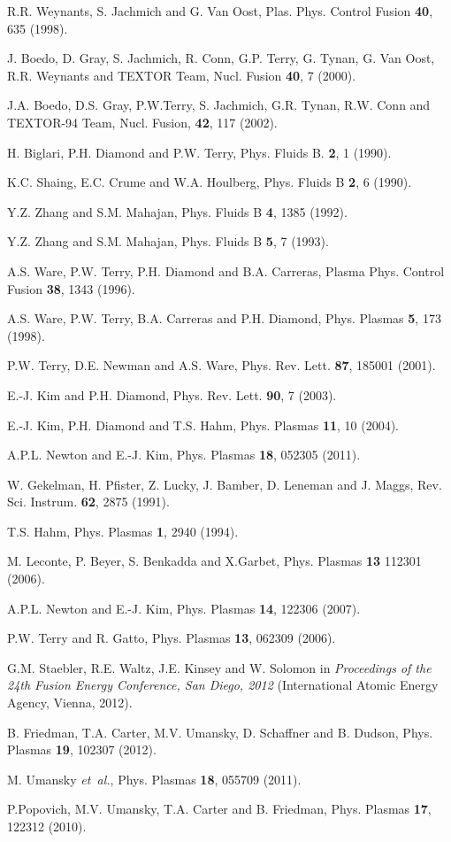\documentclass[aip,pop,amsmath,amssymb,preprint,superscriptaddress]{revtex4-1} %
\begin{document}
\begin{thebibliography}{10}
R.R. Weynants, S. Jachmich and G. Van Oost, Plas. Phys. Control Fusion {\bf 40}, 635 (1998).

J. Boedo, D. Gray, S. Jachmich, R. Conn, G.P. Terry, G. Tynan, G. Van Oost, R.R. Weynants and TEXTOR Team, Nucl. Fusion {\bf 40},  7  (2000).

J.A. Boedo, D.S. Gray, P.W.Terry, S. Jachmich, G.R. Tynan, R.W. Conn and TEXTOR-94 Team, Nucl. Fusion, {\bf 42}, 117 (2002).

H. Biglari, P.H. Diamond and P.W. Terry, Phys. Fluids B. {\bf 2},  1  (1990).

K.C. Shaing, E.C. Crume and W.A. Houlberg, Phys. Fluids B {\bf 2}, 6 (1990).

Y.Z. Zhang and S.M. Mahajan, Phys. Fluids B {\bf 4}, 1385 (1992).

Y.Z. Zhang and S.M. Mahajan, Phys. Fluids B {\bf 5}, 7 (1993).

A.S. Ware, P.W. Terry, P.H. Diamond and B.A. Carreras, Plasma Phys. Control Fusion {\bf 38},  1343  (1996).

A.S. Ware, P.W. Terry, B.A. Carreras and P.H. Diamond, Phys. Plasmas {\bf 5}, 173 (1998).

P.W. Terry, D.E. Newman and A.S. Ware, Phys. Rev. Lett. {\bf 87}, 185001  (2001).

E.-J. Kim and P.H. Diamond, Phys. Rev. Lett. {\bf 90}, 7 (2003).

E.-J. Kim, P.H. Diamond and T.S. Hahm, Phys. Plasmas {\bf 11},  10  (2004).

A.P.L. Newton and E.-J. Kim, Phys. Plasmas {\bf 18}, 052305 (2011).

W. Gekelman, H. Pfister, Z. Lucky, J. Bamber, D. Leneman and J. Maggs, Rev. Sci. Instrum. {\bf 62},  2875  (1991).

T.S. Hahm, Phys. Plasmas {\bf 1}, 2940 (1994).

M. Leconte, P. Beyer, S. Benkadda and X.Garbet, Phys. Plasmas {\bf 13} 112301 (2006).

A.P.L. Newton and E.-J. Kim, Phys. Plasmas {\bf 14}, 122306 (2007).

P.W. Terry and R. Gatto, Phys. Plasmas {\bf 13}, 062309 (2006).

G.M. Staebler, R.E. Waltz, J.E. Kinsey and W. Solomon in \textit{Proceedings of the 24th Fusion Energy Conference, San Diego, 2012} (International Atomic Energy Agency, Vienna, 2012).

B. Friedman, T.A. Carter, M.V. Umansky, D. Schaffner and B. Dudson, Phys. Plasmas {\bf 19}, 102307 (2012).

M. Umansky {\it et~al.}, Phys. Plasmas {\bf 18},  055709  (2011).

P.Popovich, M.V. Umansky, T.A. Carter and B. Friedman, Phys. Plasmas {\bf 17}, 122312 (2010).

\end{thebibliography}
\end{document}
